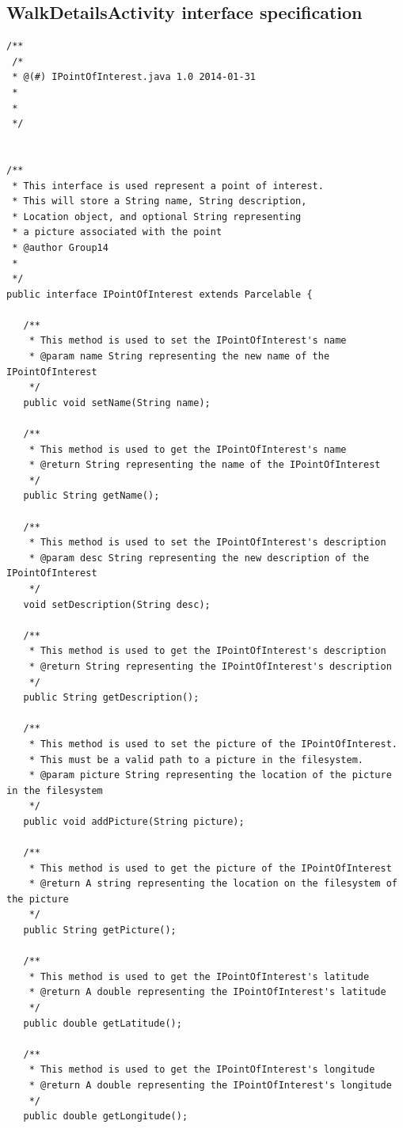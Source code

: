 \documentclass{project}
\begin{document}
\subsection{WalkDetailsActivity interface specification}
\begin{verbatim}/**
 /*
 * @(#) IPointOfInterest.java 1.0 2014-01-31
 *
 *
 */


/**
 * This interface is used represent a point of interest.
 * This will store a String name, String description,
 * Location object, and optional String representing
 * a picture associated with the point
 * @author Group14
 *
 */
public interface IPointOfInterest extends Parcelable {
   
   /**
    * This method is used to set the IPointOfInterest's name
    * @param name String representing the new name of the IPointOfInterest
    */
   public void setName(String name);
   
   /**
    * This method is used to get the IPointOfInterest's name
    * @return String representing the name of the IPointOfInterest
    */
   public String getName();
   
   /**
    * This method is used to set the IPointOfInterest's description
    * @param desc String representing the new description of the IPointOfInterest
    */
   void setDescription(String desc);
   
   /**
    * This method is used to get the IPointOfInterest's description
    * @return String representing the IPointOfInterest's description
    */
   public String getDescription();
   
   /**
    * This method is used to set the picture of the IPointOfInterest.
    * This must be a valid path to a picture in the filesystem.
    * @param picture String representing the location of the picture in the filesystem
    */
   public void addPicture(String picture);
   
   /**
    * This method is used to get the picture of the IPointOfInterest
    * @return A string representing the location on the filesystem of the picture
    */
   public String getPicture();
   
   /**
    * This method is used to get the IPointOfInterest's latitude
    * @return A double representing the IPointOfInterest's latitude
    */
   public double getLatitude();
   
   /**
    * This method is used to get the IPointOfInterest's longitude
    * @return A double representing the IPointOfInterest's longitude
    */
   public double getLongitude();
   

\end{verbatim}
\end{document}
